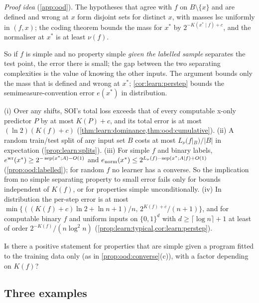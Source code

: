 \emph{Proof idea} (\cref{app:ood}). The hypotheses that agree with $f$ on $B\setminus\{x\}$ and are defined and wrong at $x$ form disjoint sets for distinct $x$, with masses lsc uniformly in $(f,x)$; the coding theorem bounds the mass for $x^*$ by $2^{-K(x^*\mid f)+c}$, and the normaliser at $x^*$ is at least $\nu(f)$.

So if $f$ is simple and no property simple \emph{given the labelled sample} separates the test point, the error there is small; the gap between the two separating complexities is the value of knowing the other inputs. The argument bounds only the mass that is defined and wrong at $x^*$; \cref{cor:learn:perstep} bounds the semimeasure-convention error $e(x^*)$ in distribution.

\begin{remark}\label{rem:ood:answer}
(i) Over any shifts, SOI's total loss exceeds that of every computable x-only predictor $P$ by at most $K(P)+c$, and its total error is at most $(\ln2)(K(f)+c)$ (\cref{thm:learn:dominance,thm:ood:cumulative}). (ii) A random train/test split of any input set $B$ costs at most $L_\nu(f|_B)/|B|$ in expectation (\cref{prop:learn:splits}). (iii) For simple $f$ and binary labels, $e^{\rm wr}(x^*)\ge2^{-\operatorname{sep}(x^*;A)-O(1)}$ and $e_{\rm norm}(x^*)\le2^{L_\nu(f)-\operatorname{sep}(x^*;A\mid f)+O(1)}$ (\cref{prop:ood:labelled}); for random $f$ no learner has a converse. So the implication from no simple separating property to small error fails only for bounds independent of $K(f)$, or for properties simple unconditionally. (iv) In distribution the per-step error is at most $\min\{((K(f)+c)\ln2+\ln n+1)/n,\,2^{K(f)+c}/(n+1)\}$, and for computable binary $f$ and uniform inputs on $\{0,1\}^d$ with $d\ge\lceil\log n\rceil+1$ at least of order $2^{-K(f)}/(n\log^2n)$ (\cref{prop:learn:typical,cor:learn:perstep}).
\end{remark}

\begin{question}\label{q:ood:converse}
Is there a positive statement for properties that are simple given a program fitted to the training data only (as in \cref{prop:ood:converse}(c)), with a factor depending on $K(f)$?
\end{question}

\subsection{Three examples}\label{sec:ood:examples}

